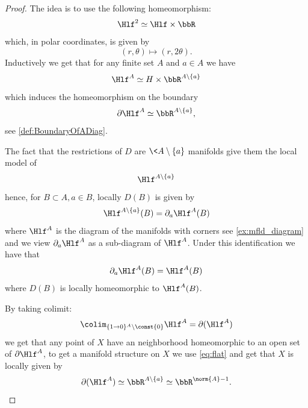 \begin{proof}
    The idea is to use the following homeomorphism:
    \begin{equation*}
        \Hlf^2 \simeq \Hlf \times \bbR
    \end{equation*}
    which, in polar coordinates, is given by 
    \begin{equation*}
        (r,\theta) \mapsto (r,2\theta).
    \end{equation*}
    Inductively we get that for any finite set $A$ and $a \in A$ we have
    \begin{equation*}
        \Hlf^A \simeq H \times \bbR^{A\setminus\{a\}}
    \end{equation*}
    which induces the homeomorphism on the boundary
    \begin{equation}\label{eq:flat}
        \partial \Hlf^A \simeq \bbR^{A\setminus\{a\}},
    \end{equation}
    see \cref{def:BoundaryOfADiag}.

    The fact that the restrictions of $D$ are $\<{A\setminus\{a\}}$ manifolds give them the local model of 
    \begin{equation*}
        \Hlf^{A\setminus\{a\}}
    \end{equation*}
    hence, for $B \subset A, a \in B$, locally $D(B)$ is given by
    \begin{equation*}
         \Hlf^{A\setminus\{a\}}(B)  = \partial_a \Hlf^A(B)
    \end{equation*}
     where $\Hlf^{A}$ is the diagram of the manifolds with corners see \cref{ex:mfld_diagram} and we view $\partial_a \Hlf^A$ as a sub-diagram of $\Hlf^A$. Under this identification we have that
    \begin{equation*}
        \partial_a \Hlf^A(B) = \Hlf^A(B)
    \end{equation*}
    where $D(B)$ is locally homeomorphic to $\Hlf^A(B)$.
    
    By taking colimit:
    \begin{equation*}
        \colim_{\{1\to 0\}^A \setminus \const{0}}  \Hlf^{A} = \partial (\Hlf^{A}) 
    \end{equation*}
    we get that any point of $X$ have an neighborhood homeomorphic to an open set of $\partial \Hlf^{A}$, to get a manifold structure on $X$ we use \cref{eq:flat} and get that $X$ is locally given by 
    \begin{equation*}
        \partial (\Hlf^{A}) \simeq \bbR^{A\setminus\{a\}} \simeq \bbR^{\norm{A}-1}.
    \end{equation*}


\end{proof}
